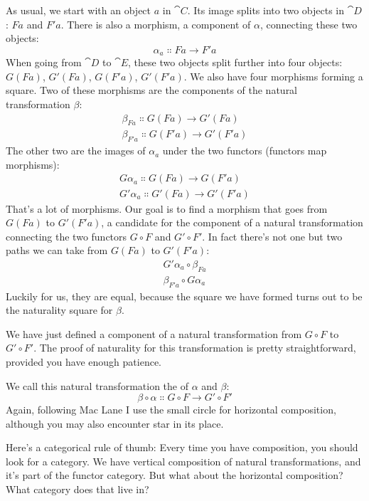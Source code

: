 \noindent
As usual, we start with an object $a$ in $\cat{C}$. Its image splits into
two objects in $\cat{D}$: $F a$ and $F'a$. There is also a
morphism, a component of $\alpha$, connecting these two objects:
\[\alpha_a \Colon F a \to F'a\]
When going from $\cat{D}$ to $\cat{E}$, these two objects split further into four
objects: $G (F a)$, $G'(F a)$, $G (F'a)$, $G'(F'a)$.
We also have four morphisms forming a square. Two of these morphisms are
the components of the natural transformation $\beta$:
\begin{gather*}
  \beta_{F a} \Colon G (F a) \to G'(F a) \\
  \beta_{F'a} \Colon G (F'a) \to G'(F'a)
\end{gather*}
The other two are the images of $\alpha_a$ under the two
functors (functors map morphisms):
\begin{gather*}
  G \alpha_a \Colon G (F a) \to G (F'a) \\
  G'\alpha_a \Colon G'(F a) \to G'(F'a)
\end{gather*}
That's a lot of morphisms. Our goal is to find a morphism that goes from
$G (F a)$ to $G'(F'a)$, a candidate for the
component of a natural transformation connecting the two functors $G \circ F$
and $G' \circ F'$. In fact there's not one but two paths we can take from
$G (F a)$ to $G'(F'a)$:
\begin{gather*}
  G'\alpha_a \circ \beta_{F a} \\
  \beta_{F'a} \circ G \alpha_a
\end{gather*}
Luckily for us, they are equal, because the square we have formed turns
out to be the naturality square for $\beta$.

We have just defined a component of a natural transformation from $G \circ F$
to $G' \circ F'$. The proof of naturality for this transformation is pretty
straightforward, provided you have enough patience.

We call this natural transformation the  of
$\alpha$ and $\beta$:
\[\beta \circ \alpha \Colon G \circ F \to G' \circ F'\]
Again, following Mac Lane I use the small circle for horizontal
composition, although you may also encounter star in its place.

Here's a categorical rule of thumb: Every time you have composition, you
should look for a category. We have vertical composition of natural
transformations, and it's part of the functor category. But what about
the horizontal composition? What category does that live in?

